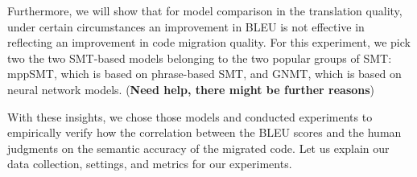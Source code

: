 %
Furthermore, we will show that for model comparison in the translation 
quality, under certain circumstances an improvement in BLEU is not effective 
in reflecting an improvement in code migration quality. For this experiment, 
we pick two the two SMT-based models belonging to the two popular groups 
of SMT: mppSMT, which is based on phrase-based SMT, and GNMT, which 
is based on neural network models. ({\bf Need help, there might be further reasons})

With these insights, we chose those models and conducted experiments
to empirically verify how the correlation between the BLEU scores and
the human judgments on the semantic accuracy of the migrated code. Let
us explain our data collection, settings, and metrics for our
experiments.
